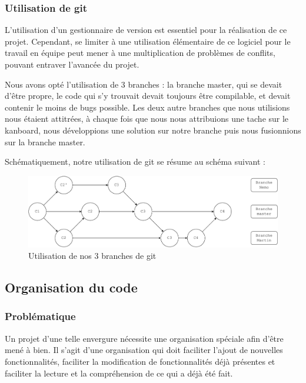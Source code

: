 \subsubsection*{Utilisation de git}

L'utilisation d'un gestionnaire de version est essentiel pour la réalisation de ce projet. Cependant, se limiter à une utilisation élémentaire de ce logiciel pour le travail en équipe peut mener à une multiplication de problèmes de conflits, pouvant entraver l'avancée du projet. 

Nous avons opté l'utilisation de 3 branches : la branche master, qui se devait d'être  propre, le code qui s'y trouvait devait toujours être compilable, et devait contenir le moins de bugs possible. Les deux autre branches que nous utilisions nous étaient attitrées, à chaque fois que nous nous attribuions une tache sur le kanboard, nous développions une solution sur notre branche puis nous fusionnions sur la branche master.

Schématiquement, notre utilisation de git se résume au schéma suivant :

\begin{center}
    \begin{figure}[H]
        \centering
        \includegraphics[width=\textwidth]{img/git_branch.pdf}
        \caption{Utilisation de nos 3 branches de git}
        \label{fig:git_branch}
    \end{figure}
\end{center}


\subsection{Organisation du code}


\subsubsection*{Problématique}


    Un projet d'une telle envergure nécessite une organisation spéciale afin d'être mené à 
bien. Il s'agit d'une organisation qui doit faciliter l'ajout de nouvelles fonctionnalités,
faciliter la modification de fonctionnalités déjà présentes et faciliter la lecture et la 
compréhension de ce qui a déjà été fait.




